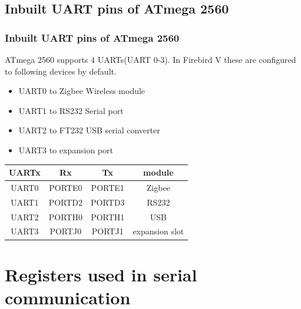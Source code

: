 \documentclass[table,10pt,red]{beamer}	%
\begin{document}
\subsection{Inbuilt UART pins of ATmega 2560} %
\begin{frame}
\frametitle{Inbuilt UART pins of ATmega 2560}
ATmega 2560 supports 4 UARTs(UART 0-3). In Firebird V these are configured to  following devices by default.
	\begin{itemize}
		\item <+-|alert@+> UART0 to  Zigbee Wireless module
		\item <+-|alert@+> UART1 to  RS232 Serial port
		\item <+-|alert@+> UART2 to  FT232 USB serial converter
		\item <+-|alert@+> UART3 to  expansion port
	\end{itemize}

\pause
\begin{table}
\begin{tabular}{c c c c}
\toprule
\textbf{UARTx} & \textbf{Rx} & \textbf{Tx} & \textbf{module} \\
\midrule
UART0 & PORTE0 & PORTE1 & Zigbee\\
UART1 & PORTD2 & PORTD3 & RS232\\
UART2 & PORTH0 & PORTH1 & USB\\
UART3 & PORTJ0 & PORTJ1 & expansion slot\\
\bottomrule
\end{tabular}
\end{table}
\end{frame}
\section{Registers used in serial communication}
\end{document}
